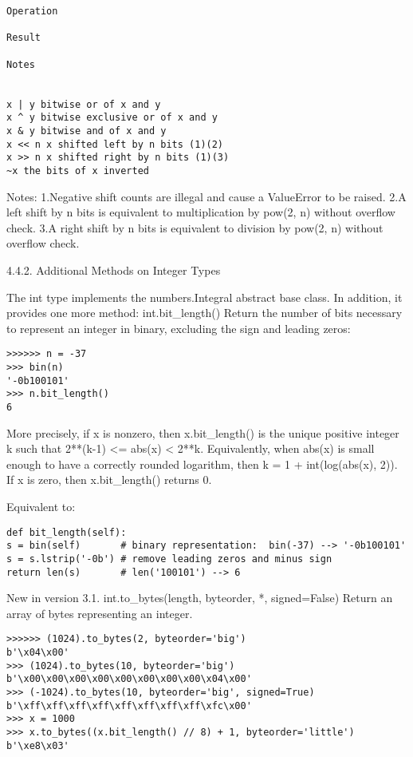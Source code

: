 \begin{lstlisting}
Operation

Result

Notes


x | y bitwise or of x and y   
x ^ y bitwise exclusive or of x and y   
x & y bitwise and of x and y   
x << n x shifted left by n bits (1)(2) 
x >> n x shifted right by n bits (1)(3) 
~x the bits of x inverted   
\end{lstlisting}

Notes:
1.Negative shift counts are illegal and cause a ValueError to be raised.
2.A left shift by n bits is equivalent to multiplication by pow(2, n) without overflow check.
3.A right shift by n bits is equivalent to division by pow(2, n) without overflow check.


4.4.2. Additional Methods on Integer Types

The int type implements the numbers.Integral abstract base class. In addition, it provides one more method:
int.bit\_length()
Return the number of bits necessary to represent an integer in binary, excluding the sign and leading zeros:

\begin{lstlisting}
>>>>>> n = -37
>>> bin(n)
'-0b100101'
>>> n.bit_length()
6
\end{lstlisting}

More precisely, if x is nonzero, then x.bit\_length() is the unique positive integer k such that 2**(k-1) <= abs(x) < 2**k. Equivalently, when abs(x) is small enough to have a correctly rounded logarithm, then k = 1 + int(log(abs(x), 2)). If x is zero, then x.bit\_length() returns 0.

Equivalent to:

\begin{lstlisting}
def bit_length(self):
s = bin(self)       # binary representation:  bin(-37) --> '-0b100101'
s = s.lstrip('-0b') # remove leading zeros and minus sign
return len(s)       # len('100101') --> 6
\end{lstlisting}


New in version 3.1.
int.to\_bytes(length, byteorder, *, signed=False)
Return an array of bytes representing an integer.

\begin{lstlisting}
>>>>>> (1024).to_bytes(2, byteorder='big')
b'\x04\x00'
>>> (1024).to_bytes(10, byteorder='big')
b'\x00\x00\x00\x00\x00\x00\x00\x00\x04\x00'
>>> (-1024).to_bytes(10, byteorder='big', signed=True)
b'\xff\xff\xff\xff\xff\xff\xff\xff\xfc\x00'
>>> x = 1000
>>> x.to_bytes((x.bit_length() // 8) + 1, byteorder='little')
b'\xe8\x03'
\end{lstlisting}

